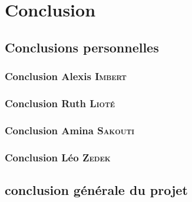 \section{Conclusion}
	\subsection{Conclusions personnelles}
		\subsubsection{Conclusion Alexis \textsc{Imbert}}
			

		\subsubsection{Conclusion Ruth \textsc{Lioté}}
			

		\subsubsection{Conclusion Amina \textsc{Sakouti}}
			

		\subsubsection{Conclusion Léo \textsc{Zedek}}
			

	\subsection{conclusion générale du projet}
		
